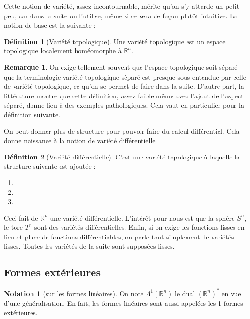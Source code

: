 \documentclass{article}
\newcommand{\R}{\mathbb{R}} %
\theoremstyle{definition} %
\newtheorem{defi}{Définition}
\newtheorem{rmq}{Remarque}
\newtheorem{nota}{Notation}
\newcommand{\1}{\mathbb{1}} %
\begin{document}
Cette notion de variété, assez incontournable, mérite qu'on s'y attarde un petit peu, car dans la suite on l'utilise, même si ce sera de façon plutôt intuitive.
La notion de base est la suivante :

\begin{defi}[Variété topologique]
    Une variété topologique est un espace topologique localement homéomorphe à $\R^n$.
\end{defi}

\begin{rmq}
    On exige tellement souvent que l'espace topologique soit séparé que la terminologie variété topologique séparé est presque sous-entendue par celle de variété topologique, ce qu'on se permet de faire dans la suite.
D'autre part, la littérature montre que cette définition, assez faible même avec l'ajout de l'aspect séparé, donne lieu à des exemples pathologiques.
Cela vaut en particulier pour la définition suivante.
\end{rmq}

On peut donner plus de structure pour pouvoir faire du calcul différentiel. Cela donne naissance à la notion de variété différentielle.

\begin{defi}[Variété différentielle]
C'est une variété topologique à laquelle la structure suivante est ajoutée :
\begin{enumerate}
    \item 
    \item
    \item
\end{enumerate}
\end{defi}

Ceci fait de $\R^n$ une variété différentielle. L'intérêt pour nous est que la sphère $S^n$, le tore $T^n$ sont des variétés différentielles.
Enfin, si on exige les fonctions lisses en lieu et place de fonctions différentiables, on parle tout simplement de variétés lisses.
Toutes les variétés de la suite sont supposées lisses.




\subsection{Formes extérieures}
\begin{nota}[sur les formes linéaires]
On note $\Lambda^1 (\R^n)$ le dual $(\R^n)^*$ en vue d'une généralisation. En fait, les formes linéaires sont aussi appelées les 1-formes extérieures.
\end{nota}
\end{document}
